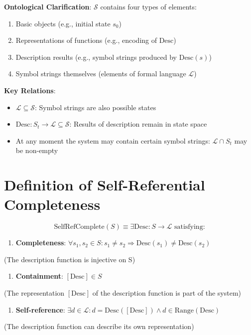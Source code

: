\textbf{Ontological Clarification}: $\mathcal{S}$ contains four types of elements:
\begin{enumerate}
\item Basic objects (e.g., initial state $s_0$)
\item Representations of functions (e.g., encoding of $\text{Desc}$)
\item Description results (e.g., symbol strings produced by $\text{Desc}(s)$)
\item Symbol strings themselves (elements of formal language $\mathcal{L}$)
\end{enumerate}

\textbf{Key Relations}:
\begin{itemize}
\item $\mathcal{L} \subseteq \mathcal{S}$: Symbol strings are also possible states
\item $\text{Desc}: S_t \to \mathcal{L} \subseteq \mathcal{S}$: Results of description remain in state space
\item At any moment the system may contain certain symbol strings: $\mathcal{L} \cap S_t$ may be non-empty
\end{itemize}

\section{Definition of Self-Referential Completeness}
\label{sec:ch01_axiom_and_derivation:definition-of-self-referential-completeness-clarification-of-selfrefcomplete-in-the-axiom}

\begin{equation}
\text{SelfRefComplete}(S) \equiv \exists \text{Desc}: S \to \mathcal{L} \text{ satisfying:}
\end{equation}

\begin{enumerate}
\item \textbf{Completeness}: $\forall s_1, s_2 \in S: s_1 \neq s_2 \Rightarrow \text{Desc}(s_1) \neq \text{Desc}(s_2)$
\end{enumerate}
  (The description function is injective on S)

\begin{enumerate}
\item \textbf{Containment}: $[\text{Desc}] \in S$ 
\end{enumerate}
  (The representation $[\text{Desc}]$ of the description function is part of the system)

\begin{enumerate}
\item \textbf{Self-reference}: $\exists d \in \mathcal{L}: d = \text{Desc}([\text{Desc}]) \land d \in \text{Range}(\text{Desc})$
\end{enumerate}
  (The description function can describe its own representation)


